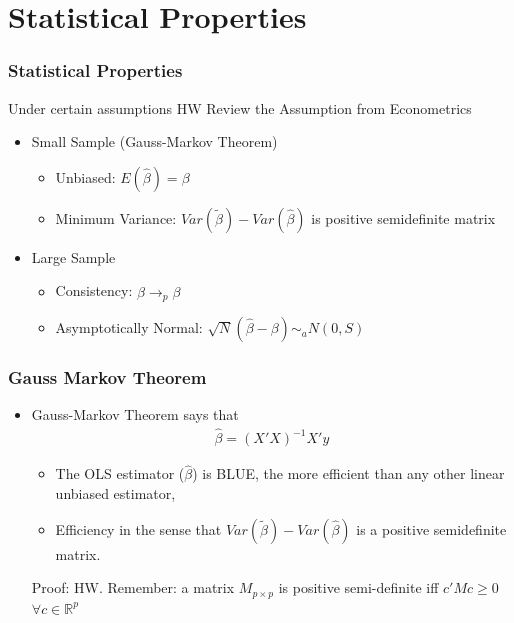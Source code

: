 \documentclass[
  shownotes,
  xcolor={svgnames},
  hyperref={colorlinks,citecolor=DarkBlue,linkcolor=DarkRed,urlcolor=DarkBlue}
  , aspectratio=169]{beamer}
\begin{document}
\section{Statistical Properties}
\begin{frame}
\frametitle{Statistical Properties}

Under certain assumptions {\tiny HW Review the Assumption from Econometrics}
\bigskip
\begin{itemize}
  \item Small Sample (Gauss-Markov Theorem)
  \medskip
  \begin{itemize}
    \item Unbiased: $E(\hat \beta) = \beta$
    \medskip
    \item Minimum Variance: $Var(\tilde \beta) - Var(\hat \beta)$ is positive semidefinite matrix
  \end{itemize}
\bigskip  
  \item Large Sample
  \medskip
  \begin{itemize}
    \item Consistency: $\hat \beta \rightarrow_p \beta$
    \medskip
    \item Asymptotically Normal: $\sqrt{N}(\hat \beta -\beta) \sim_a N(0,S)$
  \end{itemize}

\end{itemize}


\end{frame}
\begin{frame}
\frametitle{Gauss Markov Theorem}

\begin{itemize}

\item Gauss-Markov Theorem says that 
\medskip
\begin{align}
 \hat \beta = (X'X)^{-1} X'y
\end{align}

\bigskip

\begin{itemize}
  \item The OLS estimator ($\hat \beta$) is BLUE, the more efficient than any other linear unbiased estimator, 
  \medskip
  \item Efficiency in the sense that  $Var(\tilde \beta) - Var(\hat \beta)$ is a positive semidefinite matrix.
\end{itemize}

\bigskip
\tiny Proof: HW. Remember: a matrix $M_{p\times p}$ is positive semi-definite iff $c'Mc\geq0$ $\forall c\in \mathbb{R}^p$
\end{itemize}
\end{frame}
\end{document}
